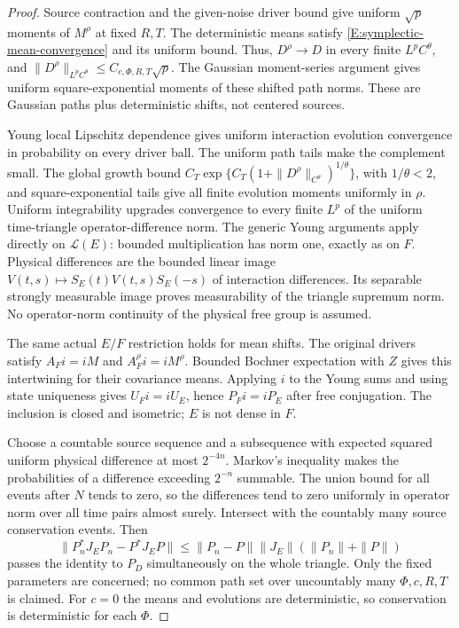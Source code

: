 \begin{proof}
  Source contraction and the given-noise driver bound give uniform
  $\sqrt p$ moments of $M^\rho$ at fixed $R,T$.
  The deterministic means satisfy
  \eqref{E:symplectic-mean-convergence} and its uniform bound.
  Thus, $D^\rho\to D$ in every finite $L^pC^\theta$, and
  $\|D^\rho\|_{L^pC^\theta}\le C_{c,\Phi,R,T}\sqrt p$.
  The Gaussian moment-series argument gives uniform square-exponential
  moments of these shifted path norms.
  These are Gaussian paths plus deterministic shifts, not centered sources.

  Young local Lipschitz dependence gives uniform interaction
  evolution convergence in probability on every driver ball.
  The uniform path tails make the complement small.
  The global growth bound
  $C_T\exp\{C_T(1+\|D^\rho\|_{C^\theta})^{1/\theta}\}$,
  with $1/\theta<2$, and square-exponential tails give all
  finite evolution moments uniformly in $\rho$.
  Uniform integrability upgrades convergence to every finite
  $L^p$ of the uniform time-triangle operator-difference norm.
  The generic Young arguments apply directly on $\mathcal L(E)$:
  bounded multiplication has norm one, exactly as on $F$.
  Physical differences are the bounded linear image
  $V(t,s)\mapsto S_E(t)V(t,s)S_E(-s)$ of interaction differences.
  Its separable strongly measurable image proves measurability
  of the triangle supremum norm. No operator-norm continuity
  of the physical free group is assumed.

  The same actual $E/F$ restriction holds for mean shifts.
  The original drivers satisfy $A_Fi=iM$ and $A_F^\rho i=iM^\rho$.
  Bounded Bochner expectation with $Z$ gives this intertwining
  for their covariance means.
  Applying $i$ to the Young sums and using state uniqueness gives
  $U_Fi=iU_E$, hence $P_Fi=iP_E$ after free conjugation.
  The inclusion is closed and isometric; $E$ is not dense in $F$.

  Choose a countable source sequence and a subsequence with expected
  squared uniform physical difference at most $2^{-4n}$.
  Markov's inequality makes the probabilities of a difference
  exceeding $2^{-n}$ summable. The union bound for all events
  after $N$ tends to zero, so the differences tend to zero
  uniformly in operator norm over all time pairs almost surely.
  Intersect with the countably many source conservation events.
  Then
  \[
    \|P_n^*J_EP_n-P^*J_EP\|
    \le\|P_n-P\|\|J_E\|(\|P_n\|+\|P\|)
  \]
  passes the identity to $P_D$ simultaneously on the whole triangle.
  Only the fixed parameters are concerned; no common path set
  over uncountably many $\Phi,c,R,T$ is claimed.
  For $c=0$ the means and evolutions are deterministic, so
  conservation is deterministic for each $\Phi$.


\end{proof}
